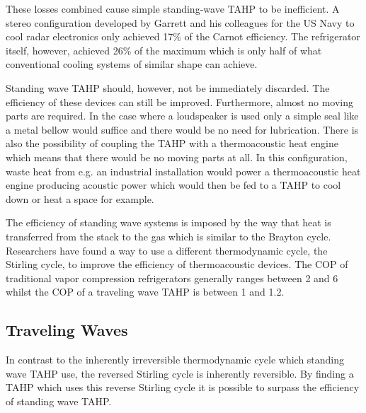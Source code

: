 \documentclass{article}
\newcommand{\newpara}
    {
      \bigbreak{}
      \noindent
    }
\begin{document}
These losses combined cause simple standing-wave TAHP to be inefficient. A stereo configuration developed by Garrett\cite{powerofsound} and his colleagues for the US Navy to cool radar electronics only achieved 17\% of the Carnot efficiency. The refrigerator itself, however, achieved 26\% of the maximum which is only half of what conventional cooling systems of similar shape can achieve. %
\newpara{}
Standing wave TAHP should, however, not be immediately discarded. The efficiency of these devices can still be improved. Furthermore, almost no moving parts are required. In the case where a loudspeaker is used only a simple seal like a metal bellow would suffice and there would be no need for lubrication. There is also the possibility of coupling the TAHP with a thermoacoustic heat engine which means that there would be no moving parts at all. In this configuration, waste heat from e.g. an industrial installation would power a thermoacoustic heat engine producing acoustic power which would then be fed to a TAHP to cool down or heat a space for example.
\newpara{}
The efficiency of standing wave systems is imposed by the way that heat is transferred from the stack to the gas which is similar to the Brayton cycle. Researchers have found a way to use a different thermodynamic cycle, the Stirling cycle, to improve the efficiency of thermoacoustic devices.\cite{ceperleyStirling}
The COP of traditional vapor compression refrigerators generally ranges between 2 and 6 whilst the COP of a traveling wave TAHP is between 1 and 1.2.\cite{Herman2006,tijaniOptimalStack}

\subsection{Traveling Waves\cite{spoelstraHighTemperature,BackHauseDetailedStudy,powerofsound,weiTravellingwave}}
In contrast to the inherently irreversible thermodynamic cycle which standing wave TAHP use, the reversed Stirling cycle is inherently reversible. By finding a TAHP which uses this reverse Stirling cycle it is possible to surpass the efficiency of standing wave TAHP.\@
\end{document}
